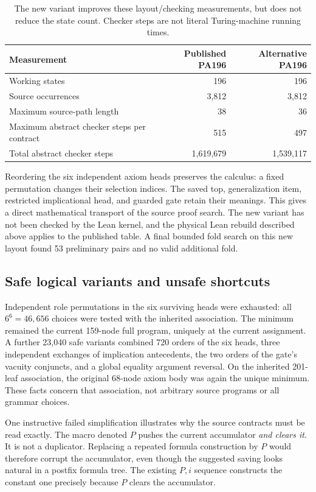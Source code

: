 \documentclass[11pt,letterpaper]{article}
\begin{document}
\begin{table}[ht]
\centering
\begin{tabular}{@{}lrr@{}}
\toprule
Measurement & Published PA196 & Alternative PA196\\
\midrule
Working states & 196 & 196\\
Source occurrences & 3,812 & 3,812\\
Maximum source-path length & 38 & 36\\
Maximum abstract checker steps per contract & 515 & 497\\
Total abstract checker steps & 1,619,679 & 1,539,117\\
\bottomrule
\end{tabular}
\caption{The new variant improves these layout/checking measurements,
but does not reduce the state count. Checker steps are not literal
Turing-machine running times.}
\end{table}

Reordering the six independent axiom heads preserves the calculus: a
fixed permutation changes their selection indices. The saved top,
generalization item, restricted implicational head, and guarded gate
retain their meanings. This gives a direct mathematical transport of
the source proof search. The new variant has not been checked by the
Lean kernel, and the physical Lean rebuild described above applies to
the published table. A final bounded fold search on this new layout
found 53 preliminary pairs and no valid additional fold.

\subsection{Safe logical variants and unsafe shortcuts}

Independent role permutations in the six surviving heads were exhausted:
all $6^6=46,656$ choices were tested with the inherited association. The
minimum remained the current 159-node full program, uniquely at the
current assignment. A further 23,040 safe variants combined 720 orders
of the six heads, three independent exchanges of implication antecedents,
the two orders of the gate's vacuity conjuncts, and a global equality
argument reversal. On the inherited 201-leaf association, the original
68-node axiom body was again the unique minimum. These facts concern that
association, not arbitrary source programs or all grammar choices.

One instructive failed simplification illustrates why the source contracts
must be read exactly. The macro denoted $P$ pushes the current accumulator
\emph{and clears it}. It is not a duplicator. Replacing a repeated formula
construction by $P$ would therefore corrupt the accumulator, even though
the suggested saving looks natural in a postfix formula tree. The
existing $P,i$ sequence constructs the constant one precisely because
$P$ clears the accumulator.
\end{document}
